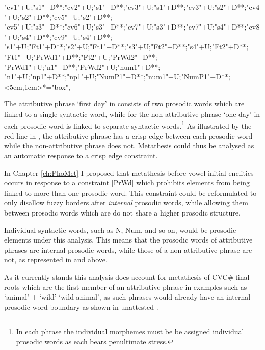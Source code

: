 \begin{multicols}{2}
\begin{exe}
{			"cv1"+U;"s1"+D**\dir{-};"cv2"+U;"s1"+D**\dir{-};"cv3"+U;"s1"+D**\dir{-};"cv3"+U;"s2"+D**\dir{-};"cv4"+U;"s2"+D**\dir{-};"cv5"+U;"s2"+D**\dir{-};
			"cv5"+U;"s3"+D**\dir{-};"cv6"+U;"s3"+D**\dir{-};"cv7"+U;"s3"+D**\dir{-};"cv7"+U;"s4"+D**\dir{-};"cv8"+U;"s4"+D**\dir{-};"cv9"+U;"s4"+D**\dir{-};
			"s1"+U;"Ft1"+D**\dir{-};"s2"+U;"Ft1"+D**\dir{-};"s3"+U;"Ft2"+D**\dir{-};"s4"+U;"Ft2"+D**\dir{-};
			"Ft1"+U;"PrWd1"+D**\dir{-};"Ft2"+U;"PrWd2"+D**\dir{-};
			"PrWd1"+U;"n1"+D**\dir{-};"PrWd2"+U;"num1"+D**\dir{-};
			"n1"+U;"np1"+D**\dir{-};"np1"+U;"NumP1"+D**\dir{-};"num1"+U;"NumP1"+D**\dir{-};
			<5em,1cm>*="box",
		\endxy}\label{as:neno-meseq}
	\end{exe}
\end{multicols}

The attributive phrase  `first day' in 
consists of two prosodic words which are linked to a single syntactic word,
while for the non-attributive phrase  `one day' in 
each prosodic word is linked to separate syntactic words.\footnote{
		In each phrase the individual morphemes must be be assigned individual
		prosodic words as each bears penultimate stress.}
As illustrated by the red line in ,
the attributive phrase has a crisp edge between
each prosodic word while the non-attributive phrase does not.
Metathesis could thus be analysed as an
automatic response to a crisp edge constraint.

In Chapter \ref{ch:PhoMet} I proposed that metathesis
before vowel initial enclitics occurs in response to
a constraint [PrWd] which prohibits
elements from being linked to more than one prosodic word.
This constraint could be reformulated to only disallow
fuzzy borders after \emph{internal} prosodic words,
while allowing them between prosodic words
which are do not share a higher prosodic structure.

Individual syntactic words, such as N, Num, and so on,
would be prosodic elements under this analysis.
This means that the prosodic words of attributive
phrases are internal prosodic words,
while those of a non-attributive phrase are not,
as represented in  and  above.

As it currently stands this analysis does
account for metathesis of CVC{\#} final roots
which are the first member of an attributive phrase
in examples such as  `animal' +  `wild'
{\ra}   \bracr{} `wild animal',
as such phrases would already have an internal prosodic
word boundary as shown in unattested .

